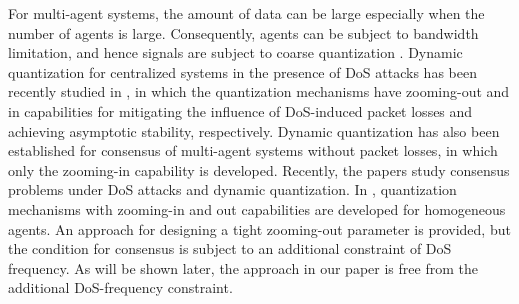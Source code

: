 \documentclass{autart}
\begin{document}
For multi-agent systems, the amount of data can be large especially when the number of agents is large. Consequently, agents can be subject to bandwidth limitation, and hence signals are subject to coarse quantization \cite{ishii2002limited, kashyap2007quantized, dibaji2017resilient,rikos2022non, XARGAY2014841,kar2009distributed}. 
Dynamic quantization for centralized systems in the presence of DoS attacks has been recently studied in \cite{feng2020tac, liu2021resilient}, in which the quantization mechanisms have zooming-out and in capabilities for mitigating the influence of DoS-induced packet losses and achieving asymptotic stability, respectively.
Dynamic quantization has also been established for consensus of multi-agent systems without packet losses\cite{you2011network}, in which only the zooming-in capability is developed.
Recently, the papers \cite{feng2020arxiv, feng2023tcns, ran2022quantized} study consensus problems
under DoS attacks and dynamic quantization. In \cite{feng2020arxiv, feng2023tcns}, quantization mechanisms with zooming-in and out capabilities are developed for homogeneous agents. An approach for designing a tight zooming-out parameter is provided, but the condition for consensus is subject to an additional constraint of DoS frequency\cite{feng2023tcns}. As will be shown later, the approach in our paper is free from the additional DoS-frequency constraint.
\end{document}
